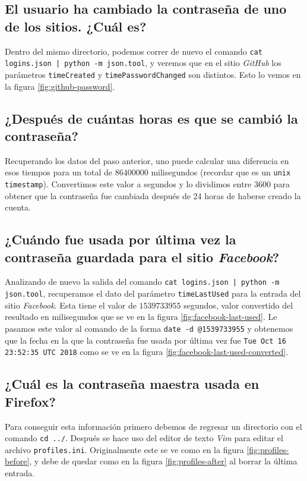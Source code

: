 \documentclass{article}
\begin{document}
        \subsection{El usuario ha cambiado la contraseña de uno de los sitios. ¿Cuál es?}

            Dentro del mismo directorio, podemos correr de nuevo el comando \texttt{cat logins.json | python -m json.tool}, y veremos que en el sitio \emph{GitHub} los parámetros \texttt{timeCreated} y \texttt{timePasswordChanged} son distintos. Esto lo vemos en la figura \ref{fig:github-password}.

        \subsection{¿Después de cuántas horas es que se cambió la contraseña?}

            Recuperando los datos del paso anterior, uno puede calcular una diferencia en esos tiempos para un total de $86400000$ milisegundos (recordar que es un \texttt{unix timestamp}). Convertimos este valor a segundos y lo dividimos entre 3600 para obtener que la contraseña fue cambiada después de 24 horas de haberse creado la cuenta.

        \subsection{¿Cuándo fue usada por última vez la contraseña guardada para el sitio \emph{Facebook}?}

            Analizando de nuevo la salida del comando \texttt{cat logins.json | python -m json.tool}, recuperamos el dato del parámetro \texttt{timeLastUsed} para la entrada del sitio \emph{Facebook}. Esta tiene el valor de $1539733955$ segundos, valor convertido del resultado en milisegundos que se ve en la figura \ref{fig:facebook-last-used}. Le pasamos este valor al comando de la forma \texttt{date -d @1539733955} y obtenemos que la fecha en la que la contraseña fue usada por última vez fue \texttt{Tue Oct 16 23:52:35 UTC 2018} como se ve en la figura \ref{fig:facebook-last-used-converted}.

        \subsection{¿Cuál es la contraseña maestra usada en Firefox?}

            Para conseguir esta información primero debemos de regresar un directorio con el comando \texttt{cd ../}. Después se hace uso del editor de texto \emph{Vim} para editar el archivo \texttt{profiles.ini}. Originalmente este se ve como en la figura \ref{fig:profiles-before}, y debe de quedar como en la figura \ref{fig:profiles-after} al borrar la última entrada.
\end{document}
